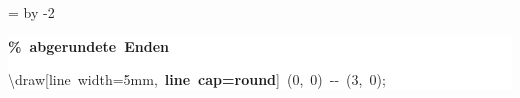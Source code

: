 \begingroup
\ttfamily
{}
=\textwidth
\advance{} by -2\fboxsep
\noindent
\colorbox{background}
{%
\parbox{\dimen255}
{%
\rule[-0.5ex]{0pt}{2.5ex}\hspace*{0.0em}\textcolor{G}{\textbf{\%~abgerundete~Enden}}\\
\rule[-0.5ex]{0pt}{2.5ex}\hspace*{0.0em}\textbackslash{}draw[line~width=5mm,~\textcolor{R}{\textbf{line~cap=round}}]~(0,~0)~{-}{-}~(3,~0);}%
}%
\endgroup
